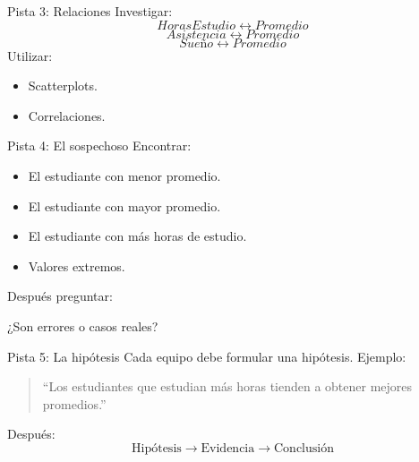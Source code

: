 \documentclass[aspectratio=169,11pt]{beamer}
\begin{document}
\begin{frame}{Pista 3: Relaciones}
Investigar:
\[
HorasEstudio \leftrightarrow Promedio
\]
\[
Asistencia \leftrightarrow Promedio
\]
\[
Sueño \leftrightarrow Promedio
\]
Utilizar:
\begin{itemize}
    \item Scatterplots.
    \item Correlaciones.
\end{itemize}
\end{frame}
\begin{frame}{Pista 4: El sospechoso}
Encontrar:
\begin{itemize}
    \item El estudiante con menor promedio.
    \item El estudiante con mayor promedio.
    \item El estudiante con más horas de estudio.
    \item Valores extremos.
\end{itemize}
Después preguntar:
\begin{center}
¿Son errores o casos reales?
\end{center}
\end{frame}
\begin{frame}{Pista 5: La hipótesis}
Cada equipo debe formular una hipótesis.
Ejemplo:
\begin{quote}
``Los estudiantes que estudian más horas tienden a obtener mejores promedios.''
\end{quote}
Después:
\[
\text{Hipótesis}
\rightarrow
\text{Evidencia}
\rightarrow
\text{Conclusión}
\]
\end{frame}
\end{document}
